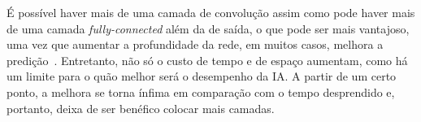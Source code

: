 %
%
%
É possível haver mais de uma camada de convolução assim como pode haver mais de uma camada \textit{fully-connected} além da de saída, o que pode ser mais vantajoso, uma vez que aumentar a profundidade da rede, em muitos casos, melhora a predição~\cite{Goodfellow-et-al-2016}.
Entretanto, não só o custo de tempo e de espaço aumentam, como há um limite para o quão melhor será o desempenho da IA.
A partir de um certo ponto, a melhora se torna ínfima em comparação com o tempo desprendido e, portanto, deixa de ser benéfico colocar mais camadas.

